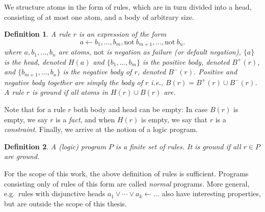 \documentclass{vutinfth} %
\newcommand{\todo}[1]{{\color{red}\textbf{TODO: {#1}}}} %
\newtheorem{definition}{Definition}[chapter]
\newcommand{\headf}{H}
\newcommand{\bodyf}{B}
\newcommand{\fail}{\mathrm{not } \ \xspace}
\newcommand{\from}{\ensuremath{\leftarrow}}
\begin{document}


We structure atoms in the form of rules, which are in turn divided into a head, consisting of at most one atom, and a body of arbitrary size.

\begin{definition}
A \emph{rule} $r$ is an expression of the form $$a \from b_1, \ldots, b_m, \fail b_{m+1}, \ldots, \fail b_n.$$ where $a, b_1, \ldots, b_n$ are atoms, $\mathrm{not}$ is \emph{negation as failure} (or \emph{default negation}), $\{ a \}$ is the \emph{head}, denoted $\headf(a)$ and $\{ b_1, \ldots, b_m \}$ is the \emph{positive body}, denoted $\bodyf^+(r)$, and $\{ b_{m+1}, \ldots, b_n \}$ is the \emph{negative body} of $r$, denoted $\bodyf^-(r)$. Positive and negative body together are simply the \emph{body} of $r$ i.e., $\bodyf(r) = \bodyf^+(r)\cup \bodyf^-(r)$.
A rule $r$ is \emph{ground} if all atoms in $\headf(r) \cup \bodyf(r)$ are.
\end{definition}

Note that for a rule $r$ both body and head can be empty: In case $\bodyf(r)$ is empty, we say $r$ is a \emph{fact}, and when $\headf(r)$ is empty, we say that $r$ is a \emph{constraint}. Finally, we arrive at the notion of a logic program.

\begin{definition}
A \emph{(logic) program} $P$ is a finite set of rules. It is \emph{ground} if all $r \in P$ are ground.
\end{definition}


For the scope of this work, the above definition of rules is sufficient. Programs consisting only of rules of this form are called \emph{normal} programs. More general, e.g.~rules with disjunctive heads $a_1 \vee \cdots \vee a_k \from \ldots$ also have interesting properties, but are outside the scope of this thesis.
\end{document}

